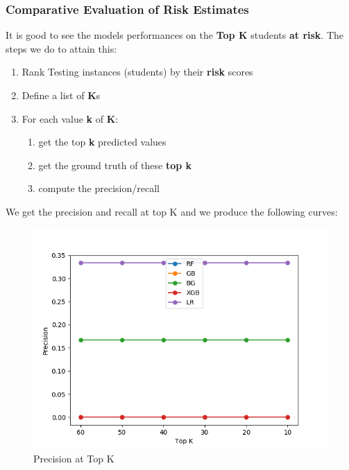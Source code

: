 \documentclass{article}
\begin{document}
\subsubsection{Comparative Evaluation of Risk Estimates}
It is good to see the models performances on the \textbf{Top K} students \textbf{at risk}. The steps we do to attain this:
\begin{enumerate}
\item Rank Testing instances (students) by their \textbf{risk} scores
\item Define a list of \textbf{K}s
\item For each value \textbf{k} of \textbf{K}:
\begin{enumerate}
\item get the top \textbf{k} predicted values
\item get the ground truth  of these \textbf{top k}
\item compute the precision/recall
\end{enumerate}
\end{enumerate}
\noindent We get the precision and recall at top K and we produce the following curves:

\begin{figure}[H]
\centering
\includegraphics[scale=0.5]{plots/toydata/precisionstopK.png}
\caption{Precision at Top K}
\label{Fig:prectopk}
\end{figure}
\end{document}
